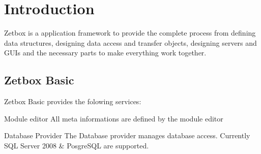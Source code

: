 \chapter{Introduction}

Zetbox is a application framework to provide the complete process from
defining data structures, designing data access and transfer objects,
designing servers and GUIs and the necessary parts to make everything
work together.

\section{Zetbox Basic}
Zetbox Basic provides the folowing services:

\begin{descriptionBorder}
\item[Module editor] { All meta informations are defined by the module editor }
\item[Database Provider] { The Database provider manages database access.
Currently SQL Server 2008 \& PosgreSQL are supported. }
\end{descriptionBorder}